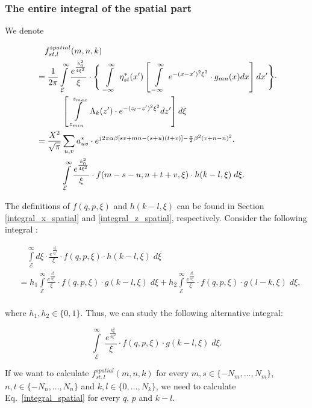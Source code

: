 \documentclass[preprint,12pt]{elsarticle}
\begin{document}
 \subsubsection{The entire integral of the spatial part}
We denote
 \begin{small}
 \begin{equation}
 \begin{split}
 &\quad f^{spatial}_{st,l}(m,n,k) \\
 &=  \frac{1}{2\pi} \int \limits^{\infty}_{\mathcal{E}}  \frac{e^{\frac{k^2_0}{4\xi^2}}}{\xi} \cdot \Bigg{\{} \; \int \limits^{\infty}_{-\infty}  \; \eta^*_{st}(x') \left[ \; \int \limits^{\infty}_{-\infty} \; e^{-(x-x')^2\xi^2} \cdot g_{mn}(x) dx \right] dx' \Bigg{\}} \cdot  \\
 &\qquad  \quad \left[ \; \int \limits^{z_{max}}_{z_{min}} \; \Lambda_k(z') \cdot e^{-(z_l-z')^2\xi^2}  dz'\right] d\xi \\ 
&= \frac{X^2}{\sqrt{\pi}} \sum_{u,v} a^*_{u v} \cdot e^{j2\pi\alpha\beta[sv +mn - (s+u)(t+v)] - \frac{\pi}{2} \beta^2 (v + n -n)^2}\cdot  \\
 &\qquad \quad \int \limits^{\infty}_{\mathcal{E}} \frac{e^{\frac{k^2_0}{4\xi^2}}}{\xi} \cdot f(m-s-u, n + t + v,\xi) \cdot h(k-l,\xi)\; d\xi . \\
 \end{split}
 \label{f_spatial_mnl_stk}
 \end{equation}
 \end{small}
  The definitions of $f(q,p,\xi)$ and $h(k-l,\xi)$ can be found in Section \ref{integral_x_spatial} and \ref{integral_z_spatial}, respectively. Consider the following integral :
  \begin{small}
  \begin{equation}
 \begin{split}
 & \quad \int \limits^{\infty}_{\mathcal{E}} d\xi  \cdot \frac{e^{\frac{k^2_0}{4\xi^2}}}{\xi} \cdot f(q, p,\xi) \cdot h(k-l ,\xi)\; d\xi  \\
 &= h_1 \int \limits^{\infty}_{\mathcal{E}}\frac{e^{\frac{k^2_0}{4\xi^2}}}{\xi} \cdot f(q, p,\xi) \cdot  g(k-l,\xi) \;  d\xi  +
 h_2 \int \limits^{\infty}_{\mathcal{E}} \frac{e^{\frac{k^2_0}{4\xi^2}}}{\xi} \cdot f(q, p,\xi) \cdot  g(l-k ,\xi) \; d\xi,\\
 \end{split}
 \end{equation}
 \end{small}
 where $h_1, h_2 \in \{0,1\}$. Thus, we can study the following alternative \mbox{integral:}
 \begin{small}
 \begin{equation}
   \int \limits^{\infty}_{\mathcal{E}} \;\frac{e^{\frac{k^2_0}{4\xi^2}}}{\xi} \cdot f(q, p,\xi) \cdot  g(k-l ,\xi) \; d\xi .
   \label{integral_spatial}
 \end{equation}
 \end{small}
 If we want to calculate $f^{spatial}_{st,l}(m,n,k)$ for every $m,s \in \{-N_m,\ldots ,N_m\}$, $n,t \in \{-N_n,\ldots,N_n\}$ and  $k,l \in \{0,\ldots, N_k\}$, we need to calculate Eq.~\eqref{integral_spatial}
 for every $q$, $p$ and $k-l$. 
\end{document}
